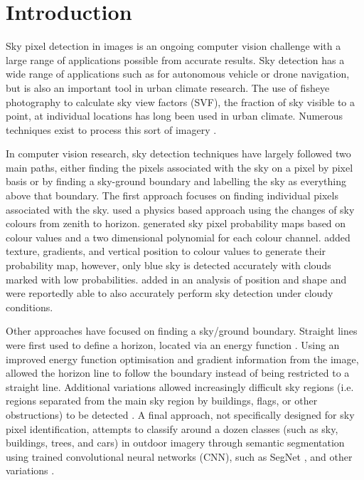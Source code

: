 \documentclass[final,3p,times,authoryear]{elsarticle}
\begin{document}
\section{Introduction}\label{sec:introduction}
Sky pixel detection in images is an ongoing computer vision challenge with a large range of applications possible from accurate results. Sky detection has a wide range of applications such as for autonomous vehicle or drone navigation, but is also an important tool in urban climate research. The use of fisheye photography to calculate sky view factors (SVF), the fraction of sky visible to a point, at individual locations has long been used in urban climate. Numerous techniques exist to process this sort of imagery \citep{Grimmond2001,Chapman2004,Ali-Toudert2007}.

In computer vision research, sky detection techniques have largely followed two main paths, either finding the pixels associated with the sky on a pixel by pixel basis or by finding a sky-ground boundary and labelling the sky as everything above that boundary. The first approach focuses on finding individual pixels associated with the sky. \cite{Luo2002} used a physics based approach using the changes of sky colours from zenith to horizon. \cite{Gallagher2004} generated sky pixel probability maps based on colour values and a two dimensional polynomial for each colour channel. \cite{Zafarifar2007} added texture, gradients, and vertical position to colour values to generate their probability map, however, only blue sky is detected accurately with clouds marked with low probabilities. \cite{Schmitt2009} added in an analysis of position and shape and were reportedly able to also accurately perform sky detection under cloudy conditions. 

Other approaches have focused on finding a sky/ground boundary. Straight lines were first used to define a horizon, located via an energy function \citep{Ettinger2003}. Using an improved energy function optimisation and gradient information from the image, \cite{Shen2013} allowed the horizon line to follow the boundary instead of being restricted to a straight line. Additional variations allowed increasingly difficult sky regions (i.e. regions separated from the main sky region by buildings, flags, or other obstructions) to be detected \citep{Zhijie2014,Zhijie2015}. A final approach, not specifically designed for sky pixel identification, attempts to classify around a dozen classes (such as sky, buildings, trees, and cars) in outdoor imagery through semantic segmentation using trained convolutional neural networks (CNN), such as SegNet \citep{Badrinarayanan2017}, and other variations \citep{Holder2016,Middel2019}.
\end{document}
